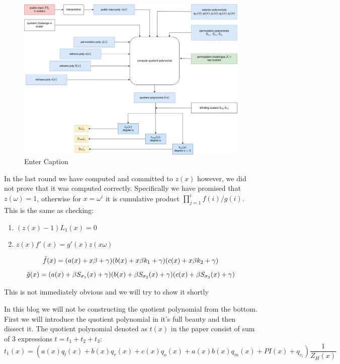 \begin{figure}[H]
    \centering
    \includegraphics[width=1\linewidth]{round-figures/round3/round3.drawio.png}
    \caption{Enter Caption}    
\end{figure}


In the last round we have computed and committed to $z(x)$ however, we did not prove that it was computed correctly. Specifically we have promised that $z(\omega) = 1$, otherwise for $x = \omega^i$ it is cumulative product $\prod_{j=1}^i f(i) / g(i)$. This is the same as checking:

\begin{enumerate}
    \item $(z(x)-1)L_1(x) = 0$
    \item $z(x)f'(x) = g'(x)z(x\omega)$
\end{enumerate}

$$\Tilde{f}(x) = (a(x) + x \beta + \gamma)(b(x) + x \beta k_1+ \gamma)(c(x) + x \beta k_2+ \gamma)$$
$$\Tilde{g}(x) = (a(x) + \beta S_{\sigma_1}(x) + \gamma)(b(x) + \beta S_{\sigma_2}(x)+ \gamma)(c(x) + \beta S_{\sigma_3}(x) + \gamma)$$

This is not immediately obvious and we will try to show it shortly


In this blog we will not be constructing the quotient polynomial from the bottom. First we will introduce the quotient polynomial in it's full beauty and then dissect it. The quotient polynomial denoted as $t(x)$ in the paper consist of sum of 3 expressions 
$t = t_1 + t_2 + t_3$:
\begin{equation}\label{quotient1}
    t_1(x) = (a(x)q_{l}(x) + b(x)q_{r}(x) + c(x)q_{o}(x) + a(x)b(x)q_{m}(x) + PI(x) + q_{c_i})\frac{1}{Z_H(x)}
\end{equation}

